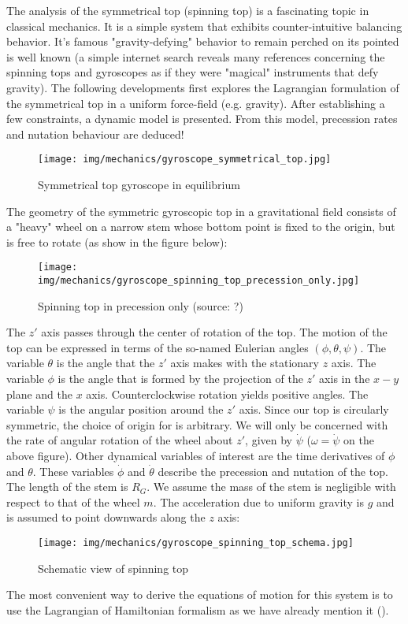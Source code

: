 	The analysis of the symmetrical top (spinning top) is a fascinating topic in classical mechanics. It is a simple system that exhibits counter-intuitive balancing behavior. It's famous "gravity-defying" behavior to remain perched on its pointed is well known (a simple internet search reveals many references concerning the spinning tops and gyroscopes as if they were "magical" instruments that defy gravity). The following developments first explores the Lagrangian formulation of the symmetrical top in a uniform force-field (e.g. gravity). After establishing a few constraints, a dynamic model is presented. From this model, precession rates and nutation behaviour are deduced!
	\begin{figure}[H]
		\centering
		\texttt{[image: img/mechanics/gyroscope\_symmetrical\_top.jpg]}
		\caption[]{Symmetrical top gyroscope in equilibrium}
	\end{figure}
	The geometry of the symmetric gyroscopic top in a gravitational field consists of a "heavy" wheel on a narrow stem whose bottom point is fixed to the origin, but is free to rotate (as show in the figure below):
	\begin{figure}[H]
		\centering
		\texttt{[image: img/mechanics/gyroscope\_spinning\_top\_precession\_only.jpg]}
		\caption[]{Spinning top in precession only (source: ?)}
	\end{figure}

	The $z'$ axis passes through the center of rotation of the top. The motion of the top can be expressed in terms of the so-named Eulerian angles $(\phi,\theta,\psi)$. The variable $\theta$ is the angle that the $z'$ axis makes with the stationary $z$ axis. The variable $\phi$ is the angle that is formed by the projection of the $z'$ axis in the $x-y$ plane and the $x$ axis. Counterclockwise rotation yields positive angles. The variable $\psi$  is the angular position around the $z'$ axis. Since our top is circularly symmetric, the choice of origin for is arbitrary. We will only be concerned with the rate of angular rotation of the wheel about $z'$, given by $\dot{\psi}$ ($\omega=\dot{\psi}$ on the above figure). Other dynamical variables of interest are the time derivatives of $\phi$ and $\theta$. These variables $\dot{\phi}$ and $\dot{\theta}$ describe the precession and nutation of the top. The length of the stem is $R_G$. We assume the mass of the stem is negligible with respect to that of the wheel $m$. The acceleration due to uniform gravity is $g$ and is assumed to point downwards along the $z$ axis:
	\begin{figure}[H]
		\centering
		\texttt{[image: img/mechanics/gyroscope\_spinning\_top\_schema.jpg]}
		\caption[]{Schematic view of spinning top}
	\end{figure}
	The most convenient way to derive the equations of motion for this system is to use the Lagrangian of Hamiltonian formalism as we have already mention it (). 
	

